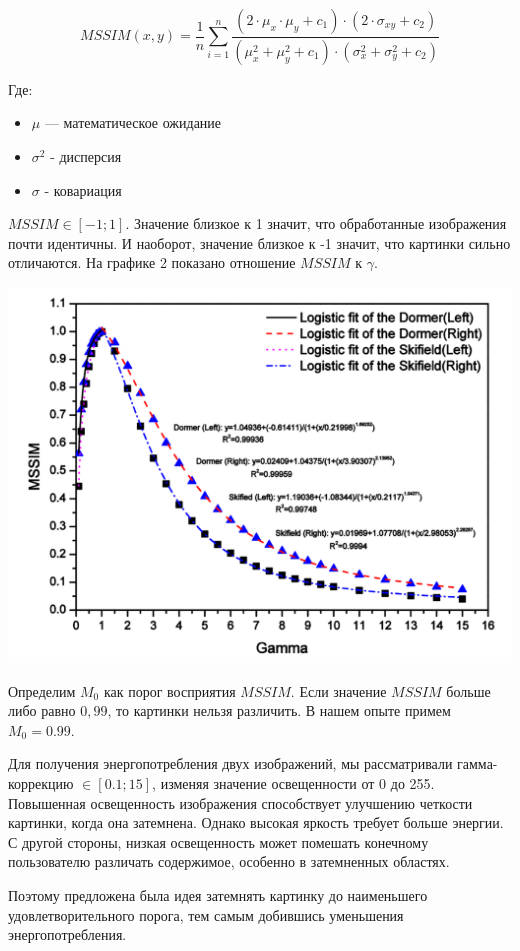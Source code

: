 \documentclass[a4paper, 12pt]{article}
\begin{document}
	
	\[MSSIM(x, y)=\frac{1}{n}\sum_{i=1}^n \frac{(2\cdot \mu_{x}\cdot \mu_{y}+c_1)\cdot (2\cdot \sigma_{x y}+c_2)}{(\mu_{x}^2+\mu_{y}^2+c_1)\cdot (\sigma_{x}^2+\sigma_{y}^2+c_2)}\]
	
	Где:
	\begin{itemize}
	    \item $\mu$ — математическое ожидание
	    \item $\sigma^2$ - дисперсия
	    \item $\sigma$ - ковариация
	\end{itemize}
	
	$MSSIM \in [-1;1]$. Значение близкое к 1 значит, что обработанные изображения почти идентичны. И наоборот, значение близкое к -1 значит, что картинки сильно отличаются. На графике 2 показано отношение $MSSIM$ к $\gamma$.
	
	\includegraphics[scale=0.6]{4}
	
	Определим $M_0$ как порог восприятия $MSSIM$. Если значение $MSSIM$ больше либо равно $0,99$, то картинки нельзя различить. В нашем опыте примем $M_0 = 0.99$. 
	
	Для получения энергопотребления двух изображений, мы рассматривали гамма-коррекцию $\in [0.1;15]$, изменяя значение освещенности от 0 до 255. Повышенная освещенность изображения способствует улучшению четкости картинки, когда она затемнена. Однако высокая яркость требует больше энергии. С другой стороны, низкая освещенность может помешать конечному пользователю различать содержимое, особенно в затемненных областях.
	
	Поэтому предложена была идея затемнять картинку до наименьшего удовлетворительного порога, тем самым добившись уменьшения энергопотребления.
	
\end{document}
